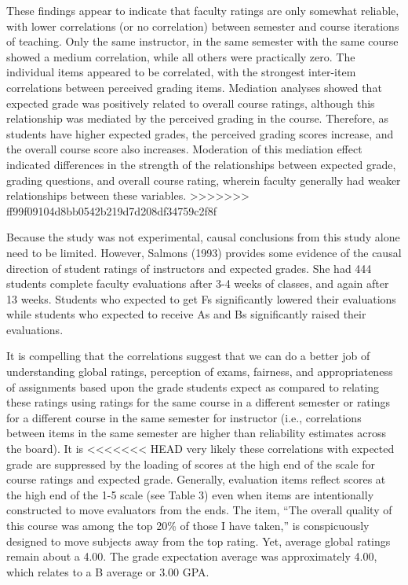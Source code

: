 \documentclass[,man]{apa6}
\theoremstyle{definition}
\theoremstyle{definition}
\theoremstyle{definition}
\theoremstyle{remark}
\begin{document}
These findings appear to indicate that faculty ratings are only somewhat
reliable, with lower correlations (or no correlation) between semester
and course iterations of teaching. Only the same instructor, in the same
semester with the same course showed a medium correlation, while all
others were practically zero. The individual items appeared to be
correlated, with the strongest inter-item correlations between perceived
grading items. Mediation analyses showed that expected grade was
positively related to overall course ratings, although this relationship
was mediated by the perceived grading in the course. Therefore, as
students have higher expected grades, the perceived grading scores
increase, and the overall course score also increases. Moderation of
this mediation effect indicated differences in the strength of the
relationships between expected grade, grading questions, and overall
course rating, wherein faculty generally had weaker relationships
between these variables.
>>>>>>> ff99f09104d8bb0542b219d7d208df34759c2f8f

Because the study was not experimental, causal conclusions from this
study alone need to be limited. However, Salmons (1993) provides some
evidence of the causal direction of student ratings of instructors and
expected grades. She had 444 students complete faculty evaluations after
3-4 weeks of classes, and again after 13 weeks. Students who expected to
get Fs significantly lowered their evaluations while students who
expected to receive As and Bs significantly raised their evaluations.

It is compelling that the correlations suggest that we can do a better
job of understanding global ratings, perception of exams, fairness, and
appropriateness of assignments based upon the grade students expect as
compared to relating these ratings using ratings for the same course in
a different semester or ratings for a different course in the same
semester for instructor (i.e., correlations between items in the same
semester are higher than reliability estimates across the board). It is
<<<<<<< HEAD
very likely these correlations with expected grade are suppressed by the
loading of scores at the high end of the scale for course ratings and
expected grade. Generally, evaluation items reflect scores at the high
end of the 1-5 scale (see Table 3) even when items are intentionally
constructed to move evaluators from the ends. The item, \enquote{The
overall quality of this course was among the top 20\% of those I have
taken,} is conspicuously designed to move subjects away from the top
rating. Yet, average global ratings remain about a 4.00. The grade
expectation average was approximately 4.00, which relates to a B average
or 3.00 GPA.
\end{document}
